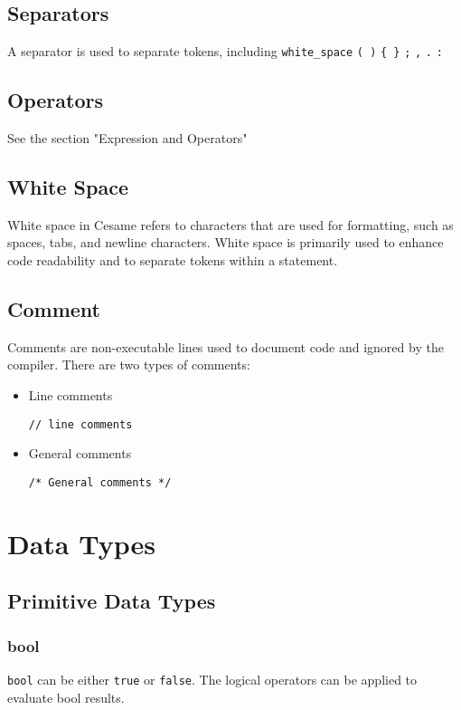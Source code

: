 \documentclass[11pt,A4]{article}
\begin{document}
        \subsection{Separators}
        A separator is used to separate tokens, including \texttt{white\_space} \texttt{( )} \texttt{\{ \}} \texttt{;} \texttt{,} \texttt{.} \texttt{:}

        \subsection{Operators}
        See the section "Expression and Operators"
        
        \subsection{White Space}
        White space in Cesame refers to characters that are used for formatting, such as spaces, tabs, and newline characters. White space is primarily used to enhance code readability and to separate tokens within a statement. 
        
        \subsection{Comment}
        Comments are non-executable lines used to document code and ignored by the compiler. There are two types of comments:
        \begin{itemize}
            \item Line comments
                \begin{lstlisting}
// line comments
                \end{lstlisting}
            \item General comments
                \begin{lstlisting}
/* General comments */
                \end{lstlisting}
        \end{itemize}

    \newpage
    \section{Data Types}
        \subsection{Primitive Data Types}
            \subsubsection{bool}
            \texttt{bool} can be either \texttt{true} or \texttt{false}. The logical operators can be applied to evaluate bool results.
            
\end{document}
